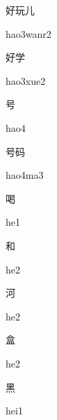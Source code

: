 \begin{multicols*}{2}
\begin{verbete}{好玩儿}
\begin{pronuncia}{hao3wanr2}
\end{pronuncia}
\end{verbete}

\begin{verbete}{好学}
\begin{pronuncia}{hao3xue2}
\end{pronuncia}
\end{verbete}

\begin{verbete}[hao4]{号}
\begin{pronuncia}{hao4}
\end{pronuncia}
\end{verbete}

\begin{verbete}[hao4ma3]{号码}
\begin{pronuncia}{hao4ma3}
\end{pronuncia}
\end{verbete}

\begin{verbete}[he1]{喝}
\begin{pronuncia}{he1}
\end{pronuncia}
\end{verbete}

\begin{verbete}[he2]{和}
\begin{pronuncia}{he2}
\end{pronuncia}
\end{verbete}

\begin{verbete}[he2]{河}
\begin{pronuncia}{he2}
\end{pronuncia}
\end{verbete}

\begin{verbete}[he2]{盒}
\begin{pronuncia}{he2}
\end{pronuncia}
\end{verbete}

\begin{verbete}[hei1]{黑}
\begin{pronuncia}{hei1}
\end{pronuncia}
\end{verbete}


\end{multicols*}
